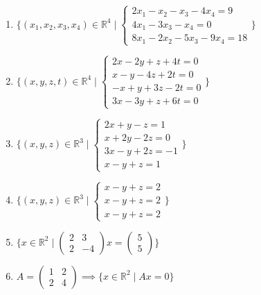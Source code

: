 \documentclass[11pt,a4paper]{article}
\begin{document}
\begin{enumerate}
\item $\displaystyle \{(x_{1}, x_{2}, x_{3}, x_{4}) \in \mathbb{R}^{4} \mid \begin{cases} 2x_{1} - x_{2} - x_{3} - 4x_{4} = 9 \\ 4x_{1} - 3x_{3} - x_{4} = 0 \\ 8x_{1} - 2x_{2} - 5x_{3} - 9x_{4} = 18 \end{cases}\}$
\item $\displaystyle \{(x, y, z, t) \in \mathbb{R}^{4} \mid \begin{cases} 2x - 2y + z + 4t = 0 \\ x - y - 4z + 2t = 0 \\ -x + y + 3z - 2t = 0 \\ 3x - 3y + z + 6t = 0 \end{cases}\}$
\item $\displaystyle \{(x, y, z) \in \mathbb{R}^{3} \mid \begin{cases} 2x + y - z = 1 \\ x + 2y - 2z = 0 \\ 3x - y + 2z = -1 \\ x - y + z = 1 \end{cases}\}$
\item $\displaystyle \{(x, y, z) \in \mathbb{R}^{3} \mid \begin{cases} x - y + z = 2 \\ x - y + z = 2 \\ x - y + z = 2 \end{cases}\}$
\item $\displaystyle \{x \in \mathbb{R}^{2} \mid \begin{pmatrix} 2 & 3 \\ 2 & -4 \end{pmatrix} x = \begin{pmatrix} 5 \\ 5 \end{pmatrix}\}$
\item $\displaystyle A = \begin{pmatrix} 1 & 2 \\ 2 & 4 \end{pmatrix} \implies \{x \in \mathbb{R}^{2} \mid A x = 0\}$
\end{enumerate}
\end{document}
